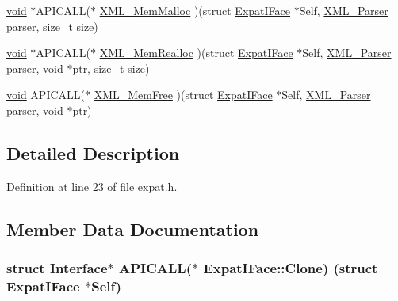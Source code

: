 \begin{DoxyCompactItemize}
\hyperlink{sound_8c_ae35f5844602719cf66324f4de2a658b3}{void} $\ast$A\+P\+I\+C\+A\+LL($\ast$ \hyperlink{struct_expat_i_face_a78462e78709dc34c8908fabcddb8ee6c}{X\+M\+L\+\_\+\+Mem\+Malloc} )(struct \hyperlink{struct_expat_i_face}{Expat\+I\+Face} $\ast$Self, \hyperlink{amiga_2include_2libraries_2expat_8h_a9dc0003156857c67b3a60b3993846013}{X\+M\+L\+\_\+\+Parser} parser, size\+\_\+t \hyperlink{group__lavu__mem_ga854352f53b148adc24983a58a1866d66}{size})
\item 
\hyperlink{sound_8c_ae35f5844602719cf66324f4de2a658b3}{void} $\ast$A\+P\+I\+C\+A\+LL($\ast$ \hyperlink{struct_expat_i_face_adddb1fbb26cb51c3d967e8e5d3634460}{X\+M\+L\+\_\+\+Mem\+Realloc} )(struct \hyperlink{struct_expat_i_face}{Expat\+I\+Face} $\ast$Self, \hyperlink{amiga_2include_2libraries_2expat_8h_a9dc0003156857c67b3a60b3993846013}{X\+M\+L\+\_\+\+Parser} parser, \hyperlink{sound_8c_ae35f5844602719cf66324f4de2a658b3}{void} $\ast$ptr, size\+\_\+t \hyperlink{group__lavu__mem_ga854352f53b148adc24983a58a1866d66}{size})
\item 
\hyperlink{sound_8c_ae35f5844602719cf66324f4de2a658b3}{void} A\+P\+I\+C\+A\+LL($\ast$ \hyperlink{struct_expat_i_face_a9992c42432ca5351a17acd465db538c7}{X\+M\+L\+\_\+\+Mem\+Free} )(struct \hyperlink{struct_expat_i_face}{Expat\+I\+Face} $\ast$Self, \hyperlink{amiga_2include_2libraries_2expat_8h_a9dc0003156857c67b3a60b3993846013}{X\+M\+L\+\_\+\+Parser} parser, \hyperlink{sound_8c_ae35f5844602719cf66324f4de2a658b3}{void} $\ast$ptr)
\end{DoxyCompactItemize}


\subsection{Detailed Description}


Definition at line 23 of file expat.\+h.



\subsection{Member Data Documentation}
\subsubsection[{\texorpdfstring{Clone}{Clone}}]{\setlength{\rightskip}{0pt plus 5cm}struct Interface$\ast$ A\+P\+I\+C\+A\+LL($\ast$ Expat\+I\+Face\+::\+Clone) (struct {\bf Expat\+I\+Face} $\ast$Self)}\hypertarget{struct_expat_i_face_a95b1bd9eddf81ed7a39663ccd1d2d394}{}\label{struct_expat_i_face_a95b1bd9eddf81ed7a39663ccd1d2d394}


